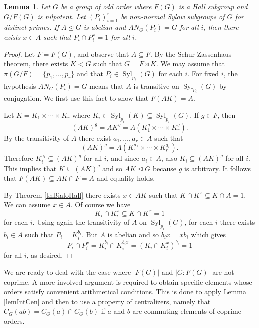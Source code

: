 \documentclass[11pt]{amsart}
\numberwithin{equation}{section}
\newtheorem{lemma}[theorem]{Lemma}
\theoremstyle{definition}
\theoremstyle{remark}
\newcommand{\Syl}{\mathop{\mathrm{Syl}}}
\begin{document}
\begin{lemma} \label{lem:key}
Let $G$ be a group of odd order where $F(G)$ is a Hall subgroup and $G/F(G)$ is nilpotent.
Let $(P_i)_{i=1}^r$ be non-normal Sylow subgroups of $G$ for distinct primes.
If $A \unlhd G$ is abelian and $AN_G(P_i)=G$ for all $i$,
then there exists $x \in A$ such that $P_i \cap P_i^x =1$ for all $i$.
\end{lemma}
\begin{proof}
Let $F=F(G)$, and observe that $A \subseteq F$.
By the Schur-Zassenhaus theorem, there exists $K<G$ such that $G= F \rtimes K$.
We may assume that $\pi(G/F) = \{p_1,\ldots,p_r\}$ and that $P_i \in \Syl_{p_i}(G)$ for each $i$.
For fixed $i$, the hypothesis $A N_G(P_i)=G$ means that $A$ is transitive on $\Syl_{p_i}(G)$ by conjugation.
We first use this fact to show that $F(AK)=A$.

Let $K=K_1 \times \cdots \times K_r$ where $K_i \in \Syl_{p_i}(K) \subseteq \Syl_{p_i}(G)$.
If $g \in F$, then
$$ (AK)^g = AK^g = A(K_1^g \times \cdots \times K_r^g) . $$
By the transitivity of $A$ there exist $a_1,\ldots,a_r \in A$ such that
$$ (AK)^g = A(K_1^{a_1} \times \cdots \times K_r^{a_r}) . $$
Therefore $K_i^{a_i} \subseteq (AK)^g$ for all $i$, and since $a_i \in A$,
also $K_i \subseteq (AK)^g$ for all $i$.
This implies that $K \subseteq (AK)^g$ and so $AK \unlhd G$ because $g$ is arbitrary.
It follows that $F(AK) \subseteq AK \cap F = A$ and equality holds.

By Theorem \ref{thBialoHall} there exists $x \in AK$ such that $K \cap K^x \subseteq K \cap A =1$.
We can assume $x\in A$.
Of course we have
$$ K_i \cap K_i^x \subseteq K \cap K^x = 1 $$
for each $i$.
Using again the transitivity of $A$ on $\Syl_{p_i}(G)$, for each $i$ there exists $b_i\in A$ such that $P_i=K_i^{b_i}$.
But $A$ is abelian and so $b_i x = x b_i$ which gives
$$ P_i \cap P_i^x = K_i^{b_i} \cap K_i^{b_i x} = (K_i \cap K_i^x)^{b_i} = 1 $$
for all $i$, as desired.
\end{proof}

We are ready to deal with the case where $|F(G)|$ and $|G:F(G)|$ are not coprime.
A more involved argument is required to obtain specific elements whose orders satisfy convenient arithmetical conditions.
This is done to apply Lemma \ref{lemIntCen} and then to use a property of centralizers,
namely that $C_G(ab)=C_G(a) \cap C_G(b)$ if $a$ and $b$ are commuting elements of coprime orders.
\end{document}
